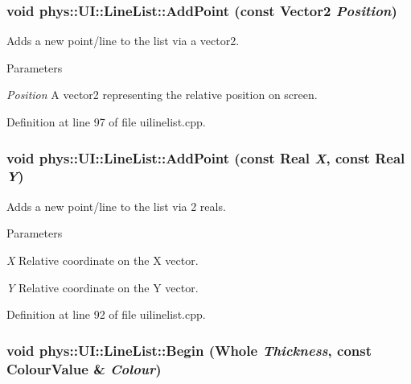 \hypertarget{classphys_1_1UI_1_1LineList_a5988b99342c7ed5d3aba5d4c33df7ed4}{
\subsubsection[{AddPoint}]{\setlength{\rightskip}{0pt plus 5cm}void phys::UI::LineList::AddPoint (const {\bf Vector2} {\em Position})}}
\label{d7/de8/classphys_1_1UI_1_1LineList_a5988b99342c7ed5d3aba5d4c33df7ed4}


Adds a new point/line to the list via a vector2. 


\begin{DoxyParams}{Parameters}
\item[{\em Position}]A vector2 representing the relative position on screen. \end{DoxyParams}


Definition at line 97 of file uilinelist.cpp.

\hypertarget{classphys_1_1UI_1_1LineList_aa7987e39f5fcf6e6351e710f1c6922ba}{
\subsubsection[{AddPoint}]{\setlength{\rightskip}{0pt plus 5cm}void phys::UI::LineList::AddPoint (const {\bf Real} {\em X}, \/  const {\bf Real} {\em Y})}}
\label{d7/de8/classphys_1_1UI_1_1LineList_aa7987e39f5fcf6e6351e710f1c6922ba}


Adds a new point/line to the list via 2 reals. 


\begin{DoxyParams}{Parameters}
\item[{\em X}]Relative coordinate on the X vector. \item[{\em Y}]Relative coordinate on the Y vector. \end{DoxyParams}


Definition at line 92 of file uilinelist.cpp.

\hypertarget{classphys_1_1UI_1_1LineList_a2f172bef99b94fa0e1d2f819b00fd8d4}{
\subsubsection[{Begin}]{\setlength{\rightskip}{0pt plus 5cm}void phys::UI::LineList::Begin ({\bf Whole} {\em Thickness}, \/  const {\bf ColourValue} \& {\em Colour})}}
\label{d7/de8/classphys_1_1UI_1_1LineList_a2f172bef99b94fa0e1d2f819b00fd8d4}


